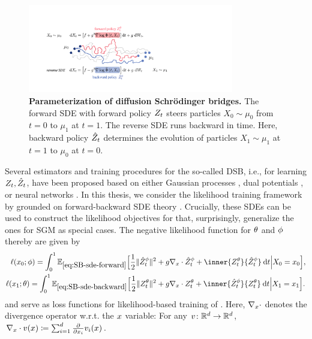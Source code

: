\begin{figure}[t]
	\centering
	\includegraphics[width=0.8\textwidth]{figures/fig_principle_dsb.pdf}
	\caption{\textbf{Parameterization of diffusion Schr{\"o}dinger bridges.} The forward SDE with forward policy {\color{pink} $Z_t$} steers particles $X_0 \sim \mu_0$ from $t=0$ to $\mu_1$ at $t=1$. The reverse SDE runs backward in time. Here, backward policy {\color{blue} $\hat{Z}_t$} determines the evolution of particles $X_1 \sim \mu_1$ at $t=1$ to $\mu_0$ at $t=0$.} 
	\label{fig:principle_dsb}
\end{figure}

Several estimators and training procedures for the so-called \acrfull{DSB}, i.e., for learning $Z_t, \hat{Z}_t$, have been proposed based on either Gaussian processes \citep{vargas2021solving}, dual potentials \citep{finlay2020learning}, or neural networks \citep{de2021diffusion, chen2021likelihood}.
In this thesis, we consider the likelihood training framework by \citet{chen2021likelihood} grounded on forward-backward \acrshort{SDE} theory \citep{}. Crucially, these SDEs can be used to construct the likelihood objectives for  that, surprisingly, generalize the ones for \acrshort{SGM} as special cases. The negative likelihood function for $\theta$ and $\phi$ thereby  are given by
\begin{subequations}
\begin{align}
\lossb =  \int_0^\horizon \mathbb{E}_{\eqref{eq:SB-sde-forward}}\Big[ \frac{1}{2}\norm{\SBbbase^{\paramb}_\ctime}^2 &+\volatbase \Div \SBbbase^{\paramb}_\ctime+ \inner{\SBfbase^{\paramf}_\ctime}{\SBbbase^{\paramb}_\ctime} \dt \Big\vert \sde[0] = \point_0 \Big] ,  \\
\lossf =  \int_0^\horizon \mathbb{E}_{\eqref{eq:SB-sde-backward}}\Big[ \frac{1}{2}\norm{\SBfbase^{\paramf}_\ctime}^2 &+\volatbase \Div \SBfbase^{\paramf}_\ctime + \inner{\SBbbase^{\paramb}_\ctime}{\SBfbase^{\paramf}_\ctime} \dt \Big\vert \sde[\horizon] = \point_{\horizon} \Big].
\end{align}
\end{subequations}
and serve as loss functions for likelihood-based training of . Here, $\nabla_{ {x} } \cdot$ denotes the divergence operator w.r.t. the $x$ variable: For any $v\colon \mathbb{R}^d \to \mathbb{R}^d$, $\nabla_{ {x} } \cdot v(x) \coloneqq \sum_{i=1}^{d} \frac{\partial}{\partial x_{i} } v_i(x)$.

